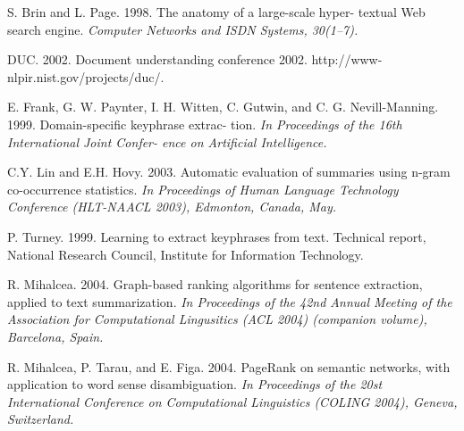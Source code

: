 \documentclass[conference]{IEEEtran}
\begin{document}
\begin{thebibliography}{1}
S. Brin and L. Page. 1998. The anatomy of a large-scale hyper- textual Web search engine. \emph{Computer Networks and ISDN Systems, 30(1–7).}

DUC. 2002. Document understanding conference 2002. http://www-nlpir.nist.gov/projects/duc/.

E. Frank, G. W. Paynter, I. H. Witten, C. Gutwin, and C. G. Nevill-Manning. 1999. Domain-specific keyphrase extrac- tion. \emph{In Proceedings of the 16th International Joint Confer- ence on Artificial Intelligence.}

C.Y. Lin and E.H. Hovy. 2003. Automatic evaluation of summaries using n-gram co-occurrence statistics. \emph{In Proceedings of Human Language Technology Conference (HLT-NAACL 2003), Edmonton, Canada, May.}

P. Turney. 1999. Learning to extract keyphrases from text. Technical report, National Research Council, Institute for Information Technology.

R. Mihalcea. 2004. Graph-based ranking algorithms for sentence extraction, applied to text summarization. \emph{In Proceedings of the 42nd Annual Meeting of the Association for Computational Lingusitics (ACL 2004) (companion volume), Barcelona, Spain.}

R. Mihalcea, P. Tarau, and E. Figa. 2004. PageRank on semantic networks, with application to word sense disambiguation. \emph{In Proceedings of the 20st International Conference on Computational Linguistics (COLING 2004), Geneva, Switzerland.}

\end{thebibliography}
\end{document}
